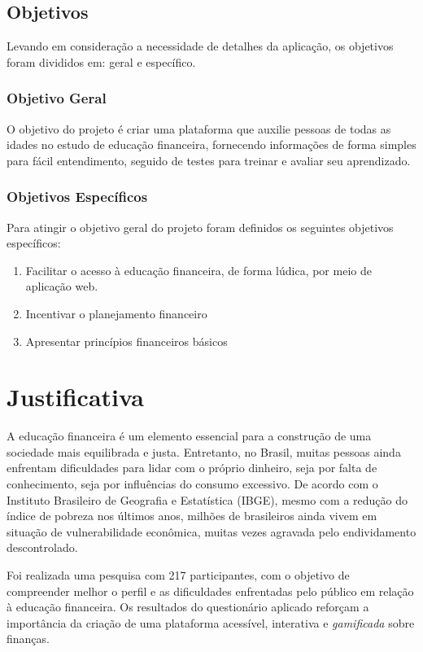 \documentclass[
	article,			%
	12pt,				%
	oneside,			%
	a4paper,			%
	english,			%
	brazil,				%
	sumario=tradicional
	]{abntex2}
\begin{document}
\subsection{Objetivos}
    Levando em consideração a necessidade de detalhes da aplicação, os objetivos foram divididos em: geral e específico.
\subsubsection{Objetivo Geral}
    O objetivo do projeto é criar uma plataforma que auxilie pessoas de todas as idades no estudo de educação financeira, fornecendo informações de forma simples para fácil entendimento, seguido de testes para treinar e avaliar seu aprendizado.
\subsubsection{Objetivos Específicos}
    Para atingir o objetivo geral do projeto foram definidos os seguintes objetivos específicos:
        \begin{enumerate}[label=\alph*)]
            \item Facilitar o acesso à educação financeira, de forma lúdica, por meio de aplicação web.
            \item Incentivar o planejamento financeiro
            \item Apresentar princípios financeiros básicos 
        \end{enumerate}
       
\section{Justificativa}    
    A educação financeira é um elemento essencial para a construção de uma sociedade mais equilibrada e justa. Entretanto, no Brasil, muitas pessoas ainda enfrentam dificuldades para lidar com o próprio dinheiro, seja por falta de conhecimento, seja por influências do consumo excessivo. De acordo com o Instituto Brasileiro de Geografia e Estatística (IBGE), mesmo com a redução do índice de pobreza nos últimos anos, milhões de brasileiros ainda vivem em situação de vulnerabilidade econômica, muitas vezes agravada pelo endividamento descontrolado.

    Foi realizada uma pesquisa com 217 participantes, com o objetivo de compreender melhor o perfil e as dificuldades enfrentadas pelo público em relação à educação financeira. Os resultados do questionário aplicado reforçam a importância da criação de uma plataforma acessível, interativa e \textit{gamificada} sobre finanças.
\end{document}
